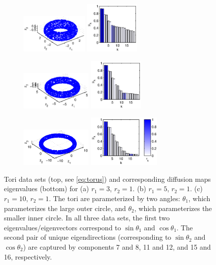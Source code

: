 \documentclass[3p]{elsarticle}
\begin{document}
\begin{figure}[t]
\centering
\begin{subfigure}{1.5in}
\centering
\includegraphics[height=0.75in]{torus1}
\includegraphics[height=1in]{torus1_evals}
\caption{}
\end{subfigure}
%
%
\begin{subfigure}{1.5in}
\centering
\includegraphics[height=0.75in]{torus2}
\includegraphics[height=1in]{torus2_evals}
\caption{}
\end{subfigure}
%
%
\begin{subfigure}{1.5in}
\centering
\includegraphics[height=0.75in]{torus3}
\includegraphics[height=1in]{torus3_evals}
\caption{}
\end{subfigure}
%
\hfill
%
\caption{Tori data sets (top, see \eqref{eq:torus}) and corresponding diffusion maps eigenvalues (bottom) for (a) $r_1 = 3$, $r_2 = 1$. (b) $r_1 = 5$, $r_2 = 1$. (c) $r_1 = 10$, $r_2 = 1$. The tori are parameterized by two angles: $\theta_1$, which parameterizes the large outer circle, and $\theta_2$, which parameterizes the smaller inner circle. In all three data sets, the first two eigenvalues/eigenvectors correspond to $\sin \theta_1$ and $\cos \theta_1$. The second pair of unique eigendirections (corresponding to $\sin \theta_2$ and $\cos \theta_2$) are captured by components 7 and 8, 11 and 12, and 15 and 16, respectively.}
%
\label{fig:torus}
%
\end{figure}
\end{document}
